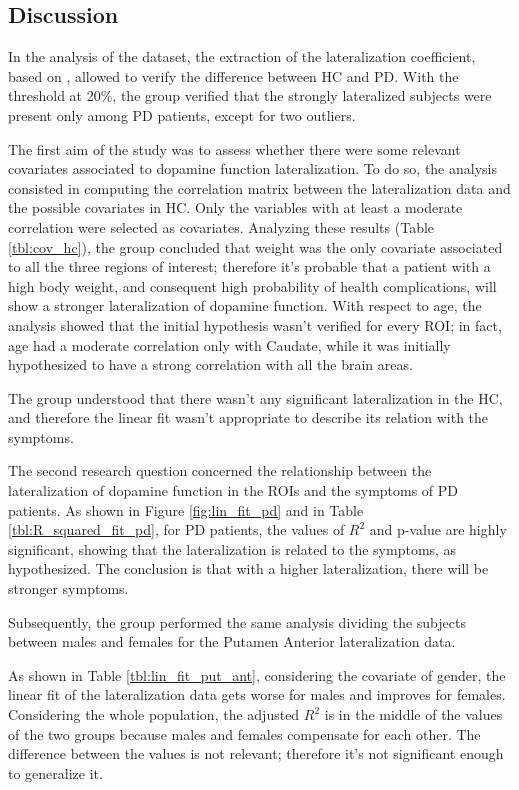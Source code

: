 \documentclass[]{article}
\begin{document}
\begin{multicols}{2}
\section{Discussion}

In the analysis of the dataset, the extraction of the lateralization coefficient, based on \cite{kaasinen_ipsilateral_2016}, allowed to verify the difference between HC and PD. With the threshold at 20\%, the group verified that the strongly lateralized subjects were present only among PD patients, except for two outliers. 

The first aim of the study was to assess whether there were some relevant covariates associated to dopamine function lateralization. To do so, the analysis consisted in computing the correlation matrix between the lateralization data and the possible covariates in HC. Only the variables with at least a moderate correlation were selected as covariates. Analyzing these results (Table \ref{tbl:cov_hc}), the group concluded that weight was the only covariate associated to all the three regions of interest; therefore it's probable that a patient with a high body weight, and consequent high probability of health complications, will show a stronger lateralization of dopamine function. With respect to age, the analysis showed that the initial hypothesis wasn't verified for every ROI; in fact, age had a moderate correlation only with Caudate, while it was initially hypothesized to have a strong correlation with all the brain areas.

The group understood that there wasn't any significant lateralization in the HC, and therefore the linear fit wasn't appropriate to describe its relation with the symptoms.

The second research question concerned the relationship between the lateralization of dopamine function in the ROIs and the symptoms of PD patients.
As shown in Figure \ref{fig:lin_fit_pd} and in Table \ref{tbl:R_squared_fit_pd}, for PD patients, the values of $R^2$ and p-value are highly significant, showing that the lateralization is related to the symptoms, as hypothesized. The conclusion is that with a higher lateralization, there will be stronger symptoms.

Subsequently, the group performed the same analysis dividing the subjects between males and females for the Putamen Anterior lateralization data.

As shown in Table \ref{tbl:lin_fit_put_ant}, considering the covariate of gender, the linear fit of the lateralization data gets worse for males and improves for females.
Considering the whole population, the adjusted $R^2$ is in the middle of the values of the two groups because males and females compensate for each other. The difference between the values is not relevant; therefore it's not significant enough to generalize it.


\end{multicols}
\end{document}
